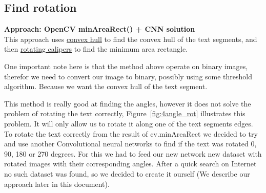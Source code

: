 \documentclass[Report.tex]{subfiles}
\begin{document}
\subsection{Find rotation}
\begin{flushleft}
  \textbf{Approach: OpenCV minAreaRect() + CNN solution} \\
  This approach uses \href{https://en.wikipedia.org/wiki/Convex_hull}{convex hull}
  to find the convex hull of the text segments, and then
  \href{https://en.wikipedia.org/wiki/Rotating_calipers}{rotating calipers} to
  find the minimum area rectangle. \par
  One important note here is that the method above operate on binary images, therefor we need to convert our image to binary, possibly using some threshold algorithm. Because we want the convex hull  of the text segment. \par
  This method is really good at finding the angles, however it does not solve the problem of rotating the text correctly, Figure~\ref{fig:4angle_rot} illustrates
  this problem. It will only allow us to rotate it along one of the text segments edges. To rotate the text correctly from the result of cv.minAreaRect we decided to try and use another Convolutional neural networks to find if the text was rotated 0, 90, 180 or 270 degrees. For this we had to feed our new network new dataset with rotated images with their corresponding angles. After a quick search on Internet no such dataset was found, so we decided to create it  ourself (We describe our approach later in this document). 


\end{flushleft}
\end{document}
